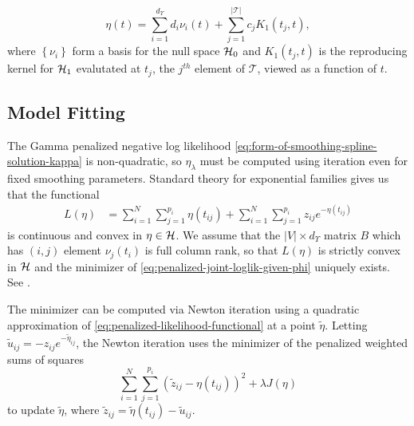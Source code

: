 \begin{equation} \label{eq:form-of-smoothing-spline-solution-kappa}
\eta\left( t \right) = \sum_{i = 1}^{d_\Upsilon} d_i \nu_i\left( t \right) + \sum_{j = 1}^{\vert \mathcal{T} \vert} c_j K_1\left(t_j,t\right),
\end{equation}  
\noindent
where $\left\{\nu_i \right\}$ form a basis for the null space $\mathcal{H}_0$ and $K_1\left(t_j,t\right)$ is the reproducing kernel for $\mathcal{H}_1$ evalutated at ${t_j}$, the $j^{th}$ element of $\mathcal{T}$, viewed as a function of $t$.


\subsection{Model Fitting}

The Gamma penalized negative log likelihood \eqref{eq:form-of-smoothing-spline-solution-kappa} is non-quadratic, so $\eta_\lambda$ must be computed using iteration even for fixed smoothing parameters. Standard theory for exponential families gives us that the functional 
\begin{align}  \label{eq:penalized-likelihood-functional}
L\left( \eta \right) &= \sum_{i = 1}^N \sum_{j = 1}^{p_i} \eta\left(t_{ij}\right)  + \sum_{i = 1}^N \sum_{j = 1}^{p_i} z_{ij} e^{-\eta\left(t_{ij}\right)} 
\end{align}
\noindent
is continuous and convex in $\eta \in \mathcal{H}$. We assume that the $\vert V \vert \times d_\Upsilon$ matrix $B$ which has $\left(i,j\right)$ element $\nu_j\left(t_i\right)$ is full column rank, so that $L\left(\eta \right)$ is strictly convex in $\mathcal{H}$ and the minimizer of \eqref{eq:penalized-joint-loglik-given-phi} uniquely exists. See \cite{wahba1995smoothing}. 

\bigskip

The minimizer can be computed via Newton iteration using a quadratic approximation of \eqref{eq:penalized-likelihood-functional} at a point $\tilde{\eta}$. Letting $\tilde{u}_{ij} = -z_{ij}e^{-\tilde{\eta}_{ij}}$, the Newton iteration uses the minimizer of the penalized weighted sums of squares
\begin{equation} \label{eq:penalized-weighted-sums-of-squares}
\sum_{i=1}^N\sum_{j=1}^{p_i} \left(\tilde{z}_{ij} - \eta\left(t_{ij}\right)  \right)^2 + \lambda J\left(\eta\right)
\end{equation}
\noindent
to update $\tilde{\eta}$, where $\tilde{z}_{ij} = \tilde{\eta}\left(t_{ij}\right) - \tilde{u}_{ij}$.



